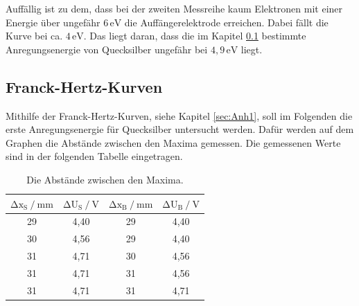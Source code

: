 \begin{flushleft}
    Auffällig ist zu dem, dass bei der zweiten Messreihe kaum Elektronen mit einer Energie über ungefähr $6\,\text{eV}$ die Auffängerelektrode erreichen.
    Dabei fällt die Kurve bei ca. $4\,\text{eV}$.
    Das liegt daran, dass die im Kapitel \ref{sec:Kap1} bestimmte Anregungsenergie von Quecksilber ungefähr bei $4,9\,\text{eV}$ liegt.
\end{flushleft}

\subsection{Franck-Hertz-Kurven} \label{sec:Kap1}

\begin{flushleft}
    Mithilfe der Franck-Hertz-Kurven, siehe Kapitel \ref{sec:Anh1}, soll im Folgenden die erste Anregungsenergie für Quecksilber untersucht werden.
    Dafür werden auf dem Graphen die Abstände zwischen den Maxima gemessen.
    Die gemessenen Werte sind in der folgenden Tabelle eingetragen.
\end{flushleft}

\begin{table}[H]
    \centering
    \caption{Die Abstände zwischen den Maxima.} 
    \label{Tabelle3}
    \begin{tabular} {c  c  c  c}
        \toprule
        {$ \increment \text{x}_{\text{S}} \mathbin{/} \unit{\milli\meter} $} &
        {$ \increment \text{U}_{\text{S}} \mathbin{/} \unit{\volt} $} &
        {$ \increment \text{x}_{\text{B}} \mathbin{/} \unit{\milli\meter} $} &
        {$ \increment \text{U}_{\text{B}} \mathbin{/} \unit{\volt} $} \\
        \midrule
         29 & 4,40 & 29 & 4,40 \\
         30 & 4,56 & 29 & 4,40 \\
         31 & 4,71 & 30 & 4,56 \\
         31 & 4,71 & 31 & 4,56 \\
         31 & 4,71 & 31 & 4,71 \\
        \bottomrule
    \end{tabular} 
\end{table}

